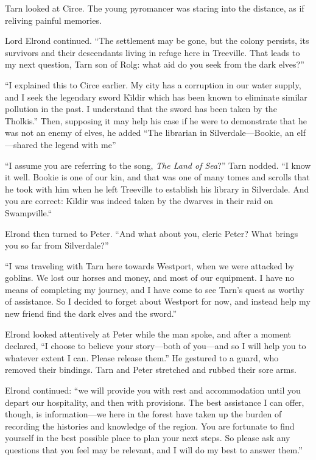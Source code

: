 Tarn looked at Circe.  The young pyromancer was staring into the distance, as if reliving painful memories.

Lord Elrond continued.  ``The settlement may be gone, but the colony persists, its survivors and their descendants living in refuge here in Treeville.  That leads to my next question, Tarn son of Rolg: what aid do you seek from the dark elves?''

``I explained this to Circe earlier.  My city has a corruption in our water supply, and I seek the legendary sword K\=\i{}ldir which has been known to eliminate similar pollution in the past.  I understand that the sword has been taken by the Tholkis.'' Then, supposing it may help his case if he were to demonstrate that he was not an enemy of elves, he added ``The librarian in Silverdale---Bookie, an elf---shared the legend with me''

``I assume you are referring to the song, \emph{The Land of Sea}?''
Tarn nodded.
``I know it well.  Bookie is one of our kin, and that was one of many tomes and scrolls that he took with him when he left Treeville to establish his library in Silverdale.  And you are correct: K\=\i{}ldir was indeed taken by the dwarves in their raid on Swampville.``

Elrond then turned to Peter.  ``And what about you, cleric Peter?  What brings you so far from Silverdale?''

``I was traveling with Tarn here towards Westport, when we were attacked by goblins.  We lost our horses and money, and most of our equipment.  I have no means of completing my journey, and I have come to see Tarn's quest as worthy of assistance.  So I decided to forget about Westport for now, and instead help my new friend find the dark elves and the sword.''

Elrond looked attentively at Peter while the man spoke, and after a moment declared, ``I choose to believe your story---both of you---and so I will help you to whatever extent I can.  Please release them.'' He gestured to a guard, who removed their bindings.  Tarn and Peter stretched and rubbed their sore arms.

Elrond continued: ``we will provide you with rest and accommodation until you depart our hospitality, and then with provisions.  The best assistance I can offer, though, is information---we here in the forest have taken up the burden of recording the histories and knowledge of the region.  You are fortunate to find yourself in the best possible place to plan your next steps.  So please ask any questions that you feel may be relevant, and I will do my best to answer them.''


